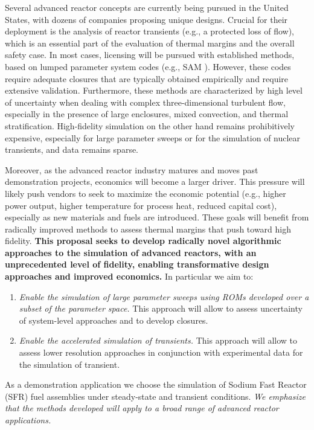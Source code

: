 Several  advanced reactor concepts are currently being pursued in the United
States, with dozens of companies proposing unique designs. Crucial for their
deployment is the analysis of  reactor transients (e.g., a protected loss of
flow), which is an essential part of the evaluation of thermal margins and the overall
safety case.  In most cases, licensing will be pursued with established
methods, based on lumped parameter system codes (e.g., SAM \cite{hu2021}).
However, these codes require adequate closures that are typically obtained
empirically and require extensive validation. Furthermore, these methods are
characterized by high level of uncertainty when dealing with complex
three-dimensional turbulent flow, especially in the presence of large
enclosures, mixed convection, and thermal stratification. High-fidelity
simulation on the other hand remains prohibitively expensive, especially for
large parameter sweeps or for the simulation of nuclear transients, and data
remains sparse.

Moreover, as the advanced reactor industry matures and moves past demonstration
projects, economics will become a larger driver. This pressure will likely push
vendors to seek to maximize the economic potential (e.g., higher power output,
higher temperature for process heat, reduced capital cost), especially as new
materials and fuels are introduced. These goals will benefit from radically
improved methods to assess thermal margins that push toward high fidelity.
\textbf{This proposal seeks to develop radically novel algorithmic approaches
to the simulation of advanced reactors, with an unprecedented level of
fidelity, enabling transformative design approaches and improved economics.}
In particular we aim to:
\begin{enumerate}
%
   \item \textit{Enable the simulation of large parameter sweeps using 
   ROMs developed over a subset of the parameter space.} This approach
   will allow to assess uncertainty of system-level approaches and to develop
   closures.
%
   \item \textit{Enable the accelerated simulation of transients.}
   This approach will allow to assess lower resolution approaches in conjunction
   with experimental data for the simulation of transient.
\\[-5ex]
\end{enumerate}
As a demonstration application we choose the simulation of Sodium Fast Reactor
(SFR) fuel assemblies under steady-state and transient conditions. \textit{We
emphasize that the methods developed will apply to a broad range of advanced
reactor applications.}

